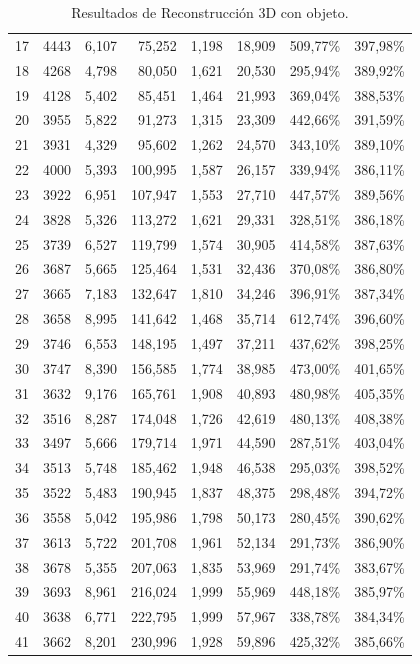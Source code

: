 \begin{table}[h]
\begin{tabular}{rrrrrrrr}
      17    & 4443  & 6,107 & 75,252 & 1,198 & 18,909 & 509,77\% & 397,98\% \\
      18    & 4268  & 4,798 & 80,050 & 1,621 & 20,530 & 295,94\% & 389,92\% \\
      19    & 4128  & 5,402 & 85,451 & 1,464 & 21,993 & 369,04\% & 388,53\% \\
      20    & 3955  & 5,822 & 91,273 & 1,315 & 23,309 & 442,66\% & 391,59\% \\
      21    & 3931  & 4,329 & 95,602 & 1,262 & 24,570 & 343,10\% & 389,10\% \\
      22    & 4000  & 5,393 & 100,995 & 1,587 & 26,157 & 339,94\% & 386,11\% \\
      23    & 3922  & 6,951 & 107,947 & 1,553 & 27,710 & 447,57\% & 389,56\% \\
      24    & 3828  & 5,326 & 113,272 & 1,621 & 29,331 & 328,51\% & 386,18\% \\
      25    & 3739  & 6,527 & 119,799 & 1,574 & 30,905 & 414,58\% & 387,63\% \\
      26    & 3687  & 5,665 & 125,464 & 1,531 & 32,436 & 370,08\% & 386,80\% \\
      27    & 3665  & 7,183 & 132,647 & 1,810 & 34,246 & 396,91\% & 387,34\% \\
      28    & 3658  & 8,995 & 141,642 & 1,468 & 35,714 & 612,74\% & 396,60\% \\
      29    & 3746  & 6,553 & 148,195 & 1,497 & 37,211 & 437,62\% & 398,25\% \\
      30    & 3747  & 8,390 & 156,585 & 1,774 & 38,985 & 473,00\% & 401,65\% \\
      31    & 3632  & 9,176 & 165,761 & 1,908 & 40,893 & 480,98\% & 405,35\% \\
      32    & 3516  & 8,287 & 174,048 & 1,726 & 42,619 & 480,13\% & 408,38\% \\
      33    & 3497  & 5,666 & 179,714 & 1,971 & 44,590 & 287,51\% & 403,04\% \\
      34    & 3513  & 5,748 & 185,462 & 1,948 & 46,538 & 295,03\% & 398,52\% \\
      35    & 3522  & 5,483 & 190,945 & 1,837 & 48,375 & 298,48\% & 394,72\% \\
      36    & 3558  & 5,042 & 195,986 & 1,798 & 50,173 & 280,45\% & 390,62\% \\
      37    & 3613  & 5,722 & 201,708 & 1,961 & 52,134 & 291,73\% & 386,90\% \\
      38    & 3678  & 5,355 & 207,063 & 1,835 & 53,969 & 291,74\% & 383,67\% \\
      39    & 3693  & 8,961 & 216,024 & 1,999 & 55,969 & 448,18\% & 385,97\% \\
      40    & 3638  & 6,771 & 222,795 & 1,999 & 57,967 & 338,78\% & 384,34\% \\
      41    & 3662  & 8,201 & 230,996 & 1,928 & 59,896 & 425,32\% & 385,66\% \\
    \end{tabular}%
    \caption{Resultados de Reconstrucción 3D con objeto.}
    \label{tab:resultado-objeto}%
\end{table}%
  

